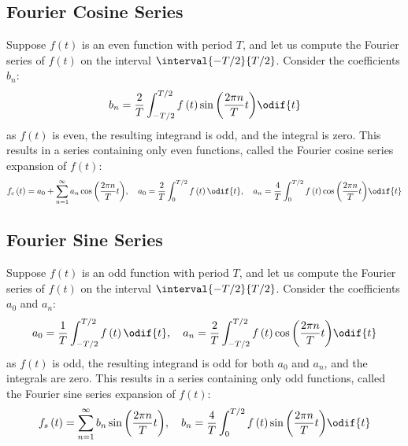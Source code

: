 \documentclass{article}
\begin{document}
\subsection{Fourier Cosine Series}
Suppose \(f\left( t \right)\) is an even function with period \(T\),
and let us compute the Fourier series of \(f\left( t \right)\) on the
interval \(\interval{-T/2}{T/2}\). Consider the coefficients \(b_n\):
\begin{equation*}
    b_n = \frac{2}{T} \int_{-T/2}^{T/2} f\left( t \right) \sin{\left( \frac{2\pi n}{T} t \right)} \odif{t}
\end{equation*}
as \(f\left( t \right)\) is even, the resulting integrand is odd, and
the integral is zero. This results in a series containing only even
functions, called the Fourier cosine series expansion of
\(f\left( t \right)\):
\begin{align*}
    f_c\left( t \right) = a_0 + \sum_{n=1}^{\infty} a_n \cos{\left( \frac{2\pi n}{T} t \right)}, \quad a_0 = \frac{2}{T} \int_{0}^{T/2} f\left( t \right) \odif{t}, \quad a_n = \frac{4}{T} \int_{0}^{T/2} f\left( t \right) \cos{\left( \frac{2\pi n}{T} t \right)} \odif{t}
\end{align*}
\subsection{Fourier Sine Series}
Suppose \(f\left( t \right)\) is an odd function with period \(T\), and
let us compute the Fourier series of \(f\left( t \right)\) on the
interval \(\interval{-T/2}{T/2}\). Consider the coefficients \(a_0\)
and \(a_n\):
\begin{equation*}
    a_0 = \frac{1}{T} \int_{-T/2}^{T/2} f\left( t \right) \odif{t}, \quad a_n = \frac{2}{T} \int_{-T/2}^{T/2} f\left( t \right) \cos{\left( \frac{2\pi n}{T} t \right)} \odif{t}
\end{equation*}
as \(f\left( t \right)\) is odd, the resulting integrand is odd for
both \(a_0\) and \(a_n\), and the integrals are zero. This results in a
series containing only odd functions, called the Fourier sine series
expansion of \(f\left( t \right)\):
\begin{equation*}
    f_s\left( t \right) = \sum_{n=1}^{\infty} b_n \sin{\left( \frac{2\pi n}{T} t \right)}, \quad b_n = \frac{4}{T} \int_{0}^{T/2} f\left( t \right) \sin{\left( \frac{2\pi n}{T} t \right)} \odif{t}
\end{equation*}
\end{document}
